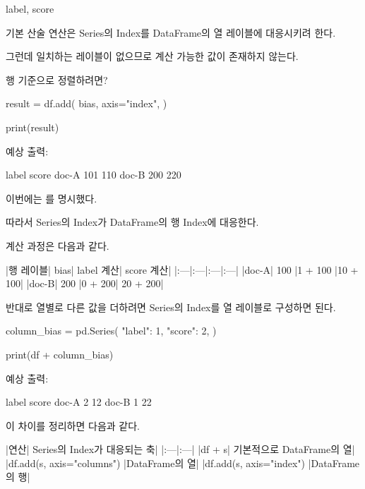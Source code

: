 \begin{dhkzsh}
label, score
\end{dhkzsh}

기본 산술 연산은 Series의 Index를 DataFrame의 열 레이블에 대응시키려 한다.

그런데 일치하는 레이블이 없으므로 계산 가능한 값이 존재하지 않는다.

\begin{dhknote}
\begin{dhksmry}[centered]
행 기준으로 정렬하려면?
\end{dhksmry}
\end{dhknote}

\begin{dhkcode}
result = df.add(
    bias,
    axis="index",
)

print(result)
\end{dhkcode}

예상 출력:

\begin{dhkzsh}
       label  score
doc-A    101    110
doc-B    200    220
\end{dhkzsh}

이번에는 를 명시했다.

따라서 Series의 Index가 DataFrame의 행 Index에 대응한다.

계산 과정은 다음과 같다.

\begin{dhktable}
|행 레이블|	bias|	label 계산|	score 계산|
|:---|:---|:---|:---|
|doc-A|	100	|1 + 100	|10 + 100|
|doc-B|	200	|0 + 200|	20 + 200|
\end{dhktable}

반대로 열별로 다른 값을 더하려면 Series의 Index를 열 레이블로 구성하면 된다.

\begin{dhkcode}
column_bias = pd.Series({
    "label": 1,
    "score": 2,
})

print(df + column_bias)
\end{dhkcode}

예상 출력:

\begin{dhkzsh}
       label  score
doc-A      2     12
doc-B      1     22
\end{dhkzsh}

이 차이를 정리하면 다음과 같다.

\begin{dhktable}
|연산|	Series의 Index가 대응되는 축|
|:---|:---|
|df + s|	기본적으로 DataFrame의 열|
|df.add(s, axis="columns")	|DataFrame의 열|
|df.add(s, axis="index")	|DataFrame의 행|
\end{dhktable}

